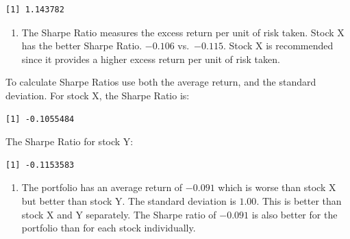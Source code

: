 \documentclass[
  letterpaper,
  DIV=11,
  numbers=noendperiod]{scrreprt}
\newenvironment{Shaded}{\begin{snugshade}}{\end{snugshade}}
\newcommand{\FloatTok}[1]{\textcolor[rgb]{0.68,0.00,0.00}{#1}}
\newcommand{\FunctionTok}[1]{\textcolor[rgb]{0.28,0.35,0.67}{#1}}
\newcommand{\NormalTok}[1]{\textcolor[rgb]{0.00,0.23,0.31}{#1}}
\newcommand{\SpecialCharTok}[1]{\textcolor[rgb]{0.37,0.37,0.37}{#1}}
\providecommand{\tightlist}{%
  \setlength{\itemsep}{0pt}\setlength{\parskip}{0pt}}\usepackage{longtable,booktabs,array}
\begin{document}
\begin{verbatim}
[1] 1.143782
\end{verbatim}

\begin{blackbox}

\begin{enumerate}
\def\labelenumi{\arabic{enumi}.}
\setcounter{enumi}{1}
\tightlist
\item
  The Sharpe Ratio measures the excess return per unit of risk taken.
  Stock X has the better Sharpe Ratio. \(-0.106\) vs.~\(-0.115\). Stock
  X is recommended since it provides a higher excess return per unit of
  risk taken.
\end{enumerate}

\end{blackbox}

To calculate Sharpe Ratios use both the average return, and the standard
deviation. For stock X, the Sharpe Ratio is:

\begin{Shaded}
\end{Shaded}

\begin{verbatim}
[1] -0.1055484
\end{verbatim}

The Sharpe Ratio for stock Y:

\begin{Shaded}
\end{Shaded}

\begin{verbatim}
[1] -0.1153583
\end{verbatim}

\begin{blackbox}

\begin{enumerate}
\def\labelenumi{\arabic{enumi}.}
\setcounter{enumi}{2}
\tightlist
\item
  The portfolio has an average return of \(-0.091\) which is worse than
  stock X but better than stock Y. The standard deviation is \(1.00\).
  This is better than stock X and Y separately. The Sharpe ratio of
  \(-0.091\) is also better for the portfolio than for each stock
  individually.
\end{enumerate}

\end{blackbox}
\end{document}
